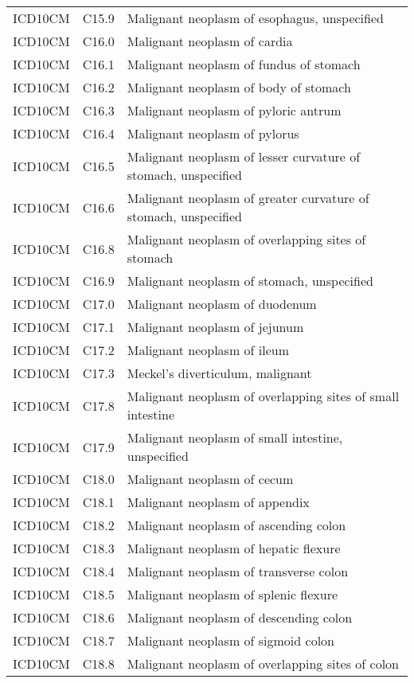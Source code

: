 \begin{table}[ht]
\begin{tabular}{lll}
  ICD10CM & C15.9 & Malignant neoplasm of esophagus, unspecified \\ 
  ICD10CM & C16.0 & Malignant neoplasm of cardia \\ 
  ICD10CM & C16.1 & Malignant neoplasm of fundus of stomach \\ 
  ICD10CM & C16.2 & Malignant neoplasm of body of stomach \\ 
  ICD10CM & C16.3 & Malignant neoplasm of pyloric antrum \\ 
  ICD10CM & C16.4 & Malignant neoplasm of pylorus \\ 
  ICD10CM & C16.5 & Malignant neoplasm of lesser curvature of stomach, unspecified \\ 
  ICD10CM & C16.6 & Malignant neoplasm of greater curvature of stomach, unspecified \\ 
  ICD10CM & C16.8 & Malignant neoplasm of overlapping sites of stomach \\ 
  ICD10CM & C16.9 & Malignant neoplasm of stomach, unspecified \\ 
  ICD10CM & C17.0 & Malignant neoplasm of duodenum \\ 
  ICD10CM & C17.1 & Malignant neoplasm of jejunum \\ 
  ICD10CM & C17.2 & Malignant neoplasm of ileum \\ 
  ICD10CM & C17.3 & Meckel's diverticulum, malignant \\ 
  ICD10CM & C17.8 & Malignant neoplasm of overlapping sites of small intestine \\ 
  ICD10CM & C17.9 & Malignant neoplasm of small intestine, unspecified \\ 
  ICD10CM & C18.0 & Malignant neoplasm of cecum \\ 
  ICD10CM & C18.1 & Malignant neoplasm of appendix \\ 
  ICD10CM & C18.2 & Malignant neoplasm of ascending colon \\ 
  ICD10CM & C18.3 & Malignant neoplasm of hepatic flexure \\ 
  ICD10CM & C18.4 & Malignant neoplasm of transverse colon \\ 
  ICD10CM & C18.5 & Malignant neoplasm of splenic flexure \\ 
  ICD10CM & C18.6 & Malignant neoplasm of descending colon \\ 
  ICD10CM & C18.7 & Malignant neoplasm of sigmoid colon \\ 
  ICD10CM & C18.8 & Malignant neoplasm of overlapping sites of colon \\ 

\end{tabular}
\end{table}
